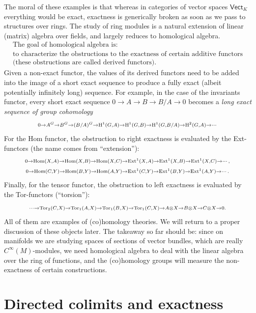 The moral of these examples is that whereas in categories of vector spaces $\mathsf{Vect}_K$ everything would be exact, exactness is generically broken as soon as we pass to structures over rings. The study of ring modules is a natural extension of linear (matrix) algebra over fields, and largely reduces to homological algebra.
\[
    \boxed{\begin{array}{c}
    \text{The goal of homological algebra is:}\\
    \text{to characterize the obstructions to the exactness of certain additive functors}\\ \text{(these obstructions are called derived functors).}
    \end{array}}
\]
Given a non-exact functor, the values of its derived functors need to be added into the image of a short exact sequence to produce a fully exact (albeit potentially infinitely long) sequence. For example, in the case of the invariants functor, every short exact sequence $0\to A\to B\to B/A\to 0$ becomes a \emph{long exact sequence of group cohomology} 
\[
    \scriptstyle
    0\to A^G\to B^G\to (B/A)^G\to \mathrm{H}^1(G,A)\to \mathrm{H}^1(G,B)\to \mathrm{H}^1(G,B/A)\to \mathrm{H}^2(G,A)\to\cdots
\]
For the Hom functor, the obstruction to right exactness is evaluated by the Ext-functors (the name comes from ``extension''):
\begin{gather}
    \scriptstyle
    0\to \operatorname{Hom}(X,A)\to \operatorname{Hom}(X,B)\to\operatorname{Hom}(X,C)\to \operatorname{Ext}^1(X,A)\to \operatorname{Ext}^1(X,B)\to\operatorname{Ext}^1(X,C)\to\cdots,\\
    \scriptstyle
    0\to \operatorname{Hom}(C,Y)\to \operatorname{Hom}(B,Y)\to\operatorname{Hom}(A,Y)\to \operatorname{Ext}^1(C,Y)\to \operatorname{Ext}^1(B,Y)\to\operatorname{Ext}^1(A,Y)\to\cdots.
\end{gather}
Finally, for the tensor functor, the obstruction to left exactness is evaluated by the Tor-functors (``torsion''):
\[
    \scriptstyle
    \cdots\to \operatorname{Tor}_2(C,X)\to \operatorname{Tor}_1(A,X)\to \operatorname{Tor}_1(B,X)\to\operatorname{Tor}_1(C,X)\to A\otimes X\to B\otimes X\to C\otimes X\to 0.
\]
All of them are examples of (co)homology theories. We will return to a proper discussion of these objects later. The takeaway so far should be: since on manifolds we are studying spaces of sections of vector bundles, which are really $C^\infty(M)$-modules, we need homological algebra to deal with the linear algebra over the ring of functions, and the (co)homology groups will measure the non-exactness of certain constructions.






\section{Directed colimits and exactness}

